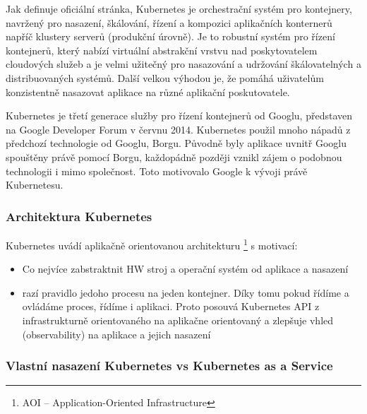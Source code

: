 \documentclass[thesis=M,czech]{FITthesis}[2019/12/23]
\theoremstyle{plain}
\theoremstyle{definition}
\begin{document}
Jak definuje oficiální stránka, Kubernetes je orchestrační systém pro kontejnery, navržený pro nasazení, škálování, řízení a kompozici aplikačních konternerů napříč klustery serverů (produkční úrovně). Je to robustní systém pro řízení  kontejnerů, který nabízí virtuální abstrakční vrstvu nad poskytovatelem cloudových služeb a je velmi užitečný pro nasazování a udržování škálovatelných a distribuovaných systémů. Další velkou výhodou je, že pomáhá uživatelům konzistentně nasazovat aplikace na různé aplikační poskutovatele.

Kubernetes je třetí generace služby pro řízení kontejnerů od Googlu, představen na Google Developer Forum v červnu 2014. Kubernetes použil mnoho nápadů z předchozí technologie od Googlu, Borgu. Původně byly aplikace uvnitř Googlu spouštěny právě pomocí Borgu, každopádně později vznikl zájem o podobnou technologii i mimo společnost. Toto motivovalo Google k vývoji právě Kubernetesu.  

\subsubsection{Architektura Kubernetes}


Kubernetes uvádí aplikačně orientovanou architekturu \footnote{AOI -- Application-Oriented Infrastructure}\cite{as-k8s-san-kho-lin}
s motivací:


\begin{itemize}  
\item  Co nejvíce zabstraktnit HW stroj a operační systém od aplikace a nasazení 
\item  razí pravidlo jedoho procesu na jeden kontejner. Díky tomu pokud řídíme a ovládáme proces, řídíme i aplikaci. Proto posouvá Kubernetes API z infrastrukturně orientovaného na aplikačne orientovaný a zlepšuje vhled (observability) na aplikace a jejich nasazení
\end{itemize}









\subsubsection{Vlastní nasazení Kubernetes vs Kubernetes as a Service}
\end{document}
